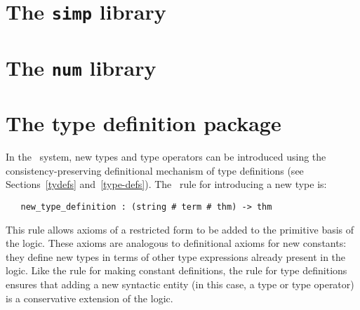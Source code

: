 \section{The {\tt simp} library}
\section{The {\tt num} library}

\newpage
\section{The type definition package}\label{types-package}

\begin{center}
\end{center}

In the \HOL\ system, new types and type operators can be
introduced
using the consistency-preserving definitional mechanism of type
definitions (see Sections~\ref{tydefs}
and~\ref{type-defs}).  The \ML\ rule for introducing a new type is:

\begin{hol}
\begin{verbatim}
   new_type_definition : (string # term # thm) -> thm
\end{verbatim}\end{hol}

\noindent This rule allows
axioms of a restricted form to be added to the primitive basis of the logic.
These axioms are analogous to definitional axioms for new constants: they
define new types in terms of other type expressions already present in the
logic. Like the rule  for making constant definitions,
the rule  
 for type definitions
ensures that adding a new syntactic entity (in this case, a type or
type operator) is a conservative extension of the logic.


